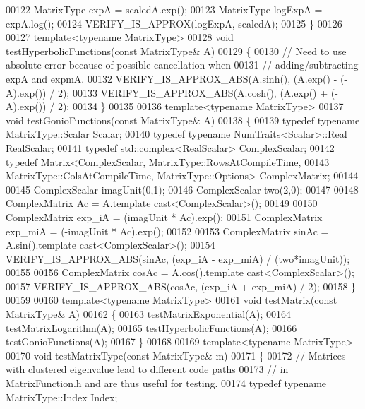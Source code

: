 \begin{DoxyCode}
00122   MatrixType expA = scaledA.exp();
00123   MatrixType logExpA = expA.log();
00124   VERIFY\_IS\_APPROX(logExpA, scaledA);
00125 \}
00126 
00127 \textcolor{keyword}{template}<\textcolor{keyword}{typename} MatrixType>
00128 \textcolor{keywordtype}{void} testHyperbolicFunctions(\textcolor{keyword}{const} MatrixType& A)
00129 \{
00130   \textcolor{comment}{// Need to use absolute error because of possible cancellation when}
00131   \textcolor{comment}{// adding/subtracting expA and expmA.}
00132   VERIFY\_IS\_APPROX\_ABS(A.sinh(), (A.exp() - (-A).exp()) / 2);
00133   VERIFY\_IS\_APPROX\_ABS(A.cosh(), (A.exp() + (-A).exp()) / 2);
00134 \}
00135 
00136 \textcolor{keyword}{template}<\textcolor{keyword}{typename} MatrixType>
00137 \textcolor{keywordtype}{void} testGonioFunctions(\textcolor{keyword}{const} MatrixType& A)
00138 \{
00139   \textcolor{keyword}{typedef} \textcolor{keyword}{typename} MatrixType::Scalar Scalar;
00140   \textcolor{keyword}{typedef} \textcolor{keyword}{typename} NumTraits<Scalar>::Real RealScalar;
00141   \textcolor{keyword}{typedef} std::complex<RealScalar> ComplexScalar;
00142   \textcolor{keyword}{typedef} Matrix<ComplexScalar, MatrixType::RowsAtCompileTime, 
00143                  MatrixType::ColsAtCompileTime, MatrixType::Options> ComplexMatrix;
00144 
00145   ComplexScalar imagUnit(0,1);
00146   ComplexScalar two(2,0);
00147 
00148   ComplexMatrix Ac = A.template cast<ComplexScalar>();
00149   
00150   ComplexMatrix exp\_iA = (imagUnit * Ac).exp();
00151   ComplexMatrix exp\_miA = (-imagUnit * Ac).exp();
00152   
00153   ComplexMatrix sinAc = A.sin().template cast<ComplexScalar>();
00154   VERIFY\_IS\_APPROX\_ABS(sinAc, (exp\_iA - exp\_miA) / (two*imagUnit));
00155   
00156   ComplexMatrix cosAc = A.cos().template cast<ComplexScalar>();
00157   VERIFY\_IS\_APPROX\_ABS(cosAc, (exp\_iA + exp\_miA) / 2);
00158 \}
00159 
00160 \textcolor{keyword}{template}<\textcolor{keyword}{typename} MatrixType>
00161 \textcolor{keywordtype}{void} testMatrix(\textcolor{keyword}{const} MatrixType& A)
00162 \{
00163   testMatrixExponential(A);
00164   testMatrixLogarithm(A);
00165   testHyperbolicFunctions(A);
00166   testGonioFunctions(A);
00167 \}
00168 
00169 \textcolor{keyword}{template}<\textcolor{keyword}{typename} MatrixType>
00170 \textcolor{keywordtype}{void} testMatrixType(\textcolor{keyword}{const} MatrixType& m)
00171 \{
00172   \textcolor{comment}{// Matrices with clustered eigenvalue lead to different code paths}
00173   \textcolor{comment}{// in MatrixFunction.h and are thus useful for testing.}
00174   \textcolor{keyword}{typedef} \textcolor{keyword}{typename} MatrixType::Index Index;

\end{DoxyCode}
